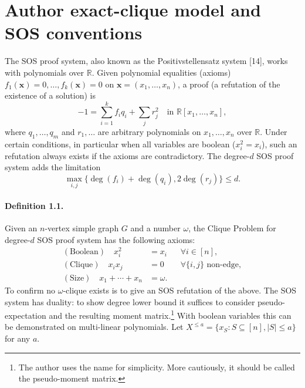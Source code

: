 \section*{Author exact-clique model and SOS conventions}
The SOS proof system, also known as the Positivstellensatz system [14], works with polynomials over $\mathbb R$. Given polynomial equalities (axioms) $f_1(\mathbf x)=0,\ldots,f_k(\mathbf x)=0$ on $\mathbf x=(x_1,\ldots,x_n)$, a proof (a refutation of the existence of a solution) is
\[-1=\sum_{i=1}^kf_iq_i+\sum_jr_j^2\quad\text{in }\mathbb R[x_1,\ldots,x_n],\]
where $q_1,\ldots,q_m$ and $r_1,\ldots$ are arbitrary polynomials on $x_1,\ldots,x_n$ over $\mathbb R$. Under certain conditions, in particular when all variables are boolean ($x_i^2=x_i$), such an refutation always exists if the axioms are contradictory. The degree-$d$ SOS proof system adds the limitation
\[\max_{i,j}\{\deg(f_i)+\deg(q_i),2\deg(r_j)\}\le d.\]
\paragraph{Definition 1.1.} Given an $n$-vertex simple graph $G$ and a number $\omega$, the Clique Problem for degree-$d$ SOS proof system has the following axioms:
\begin{align*}(\text{Boolean})\quad x_i^2&=x_i&&\forall i\in[n],\\(\text{Clique})\quad x_ix_j&=0&&\forall\{i,j\}\text{ non-edge},\\(\text{Size})\quad x_1+\cdots+x_n&=\omega.&&\tag{1.1}\end{align*}
To confirm no $\omega$-clique exists is to give an SOS refutation of the above. The SOS system has duality: to show degree lower bound it suffices to consider pseudo-expectation and the resulting moment matrix.\footnote{The author uses the name for simplicity. More cautiously, it should be called the pseudo-moment matrix.} With boolean variables this can be demonstrated on multi-linear polynomials. Let $X^{\le a}=\{x_S:S\subseteq[n],|S|\le a\}$ for any $a$.

